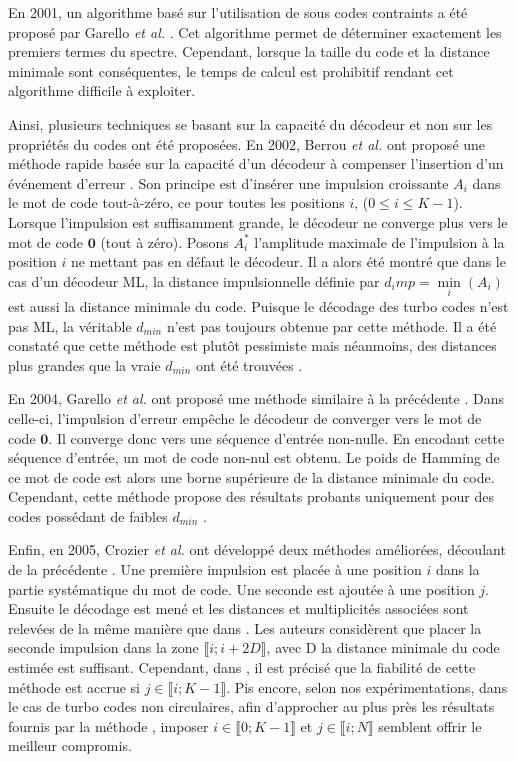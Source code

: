 En 2001, un algorithme basé sur l'utilisation de sous codes contraints a été proposé par Garello \textit{et al.} \cite{garellodfree}. 
Cet algorithme permet de déterminer exactement les premiers termes du spectre. Cependant, lorsque la taille du code et la 
distance minimale sont conséquentes, le temps de calcul est prohibitif rendant cet algorithme difficile à exploiter.
	
Ainsi, plusieurs techniques se basant sur la capacité du décodeur et non sur les propriétés du codes ont été proposées. En 2002, Berrou \textit{et al.} ont proposé une méthode rapide basée sur la capacité d'un 
décodeur à compenser l'insertion d'un événement d'erreur \cite{eim}. Son principe est d'insérer une impulsion croissante 
$A_i$ dans le mot de code tout-à-zéro, ce pour toutes les positions $i$, ($0\le i \le K-1$). Lorsque l'impulsion est 
suffisamment grande, le décodeur ne converge plus vers le mot de code $\mathbf{0}$ (tout à zéro). Posons $A_i^*$ l'amplitude 
maximale de l’impulsion à la position $i$ ne mettant pas en défaut le décodeur. Il a alors été montré que dans le cas 
d'un décodeur ML, la distance impulsionnelle définie par $d_imp = \min\limits_i (A_i)$ est aussi la distance minimale 
du code. Puisque le décodage des turbo codes n'est pas ML, la véritable $d_{min}$ n'est pas toujours obtenue par cette 
méthode. Il a été constaté que cette méthode est plutôt pessimiste mais néanmoins, des distances plus grandes que la 
vraie $d_{min}$ ont été trouvées \cite{yocComparisonMethods}.
	
En 2004, Garello \textit{et al.} ont proposé une méthode similaire à la précédente \cite{garelloAllZero}. Dans celle-ci, 
l'impulsion d'erreur empêche le décodeur de converger vers le mot de code $\mathbf{0}$. Il converge donc vers une séquence 
d'entrée non-nulle. En encodant cette séquence d'entrée, un mot de code non-nul est obtenu. Le poids de Hamming de ce mot 
de code est alors une borne supérieure de la distance minimale du code. Cependant, cette méthode propose des résultats 
probants uniquement pour des codes possédant de faibles $d_{min}$ \cite{yocComparisonMethods}.
	
Enfin, en 2005, Crozier \textit{et al.} ont développé deux méthodes améliorées, découlant de la précédente \cite{crozierDIM}. 
Une première impulsion est placée à une position $i$ dans la partie systématique du mot de code. Une seconde est ajoutée 
à une position $j$. Ensuite le décodage est mené et les distances et multiplicités associées sont relevées de la même 
manière que dans \cite{garelloAllZero}. Les auteurs considèrent que placer la seconde impulsion dans la zone $\llbracket i; i+2D\rrbracket$, 
avec D la distance minimale du code estimée est suffisant. Cependant, dans \cite{yocComparisonMethods}, il est précisé 
que la fiabilité de cette méthode est accrue si $j \in \llbracket i; K-1\rrbracket$. Pis encore, selon nos expérimentations, 
dans le cas de turbo codes non circulaires, afin d’approcher au plus près les résultats fournis par la méthode \cite{garellodfree}, 
imposer $i \in \llbracket 0; K-1\rrbracket$ et $j \in \llbracket i; N\rrbracket$ semblent offrir le meilleur compromis.
	
